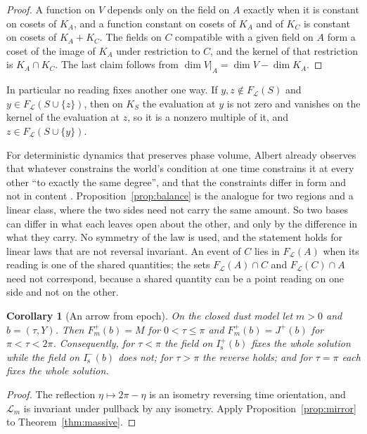 \documentclass[11pt]{article}
\newtheorem{corollary}[theorem]{Corollary}
\theoremstyle{definition}
\newcommand{\Jp}{J^{+}}
\newcommand{\Is}{I^-_{\mathrm s}}
\newcommand{\Isp}{I^+_{\mathrm s}}
\begin{document}
\begin{proof}
A function on $V$ depends only on the field on $A$ exactly when it is constant on cosets of $K_A$, and a function constant on cosets of $K_A$ and of $K_C$ is constant on cosets of $K_A+K_C$. The fields on $C$ compatible with a given field on $A$ form a coset of the image of $K_A$ under restriction to $C$, and the kernel of that restriction is $K_A\cap K_C$. The last claim follows from $\dim V|_A=\dim V-\dim K_A$.
\end{proof}

In particular no reading fixes another one way. If $y,z\notin F_{\mathcal L}(S)$ and $y\in F_{\mathcal L}(S\cup\{z\})$, then on $K_S$ the evaluation at $y$ is not zero and vanishes on the kernel of the evaluation at $z$, so it is a nonzero multiple of it, and $z\in F_{\mathcal L}(S\cup\{y\})$.

For deterministic dynamics that preserves phase volume, Albert already observes that whatever constrains the world's condition at one time constrains it at every other ``to exactly the same degree'', and that the constraints differ in form and not in content \citep[pp.~121--122, n.~11]{Albert2000}. Proposition~\ref{prop:balance} is the analogue for two regions and a linear class, where the two sides need not carry the same amount. So two bases can differ in what each leaves open about the other, and only by the difference in what they carry. No symmetry of the law is used, and the statement holds for linear laws that are not reversal invariant. An event of $C$ lies in $F_{\mathcal L}(A)$ when its reading is one of the shared quantities; the sets $F_{\mathcal L}(A)\cap C$ and $F_{\mathcal L}(C)\cap A$ need not correspond, because a shared quantity can be a point reading on one side and not on the other.

\begin{corollary}[An arrow from epoch]\label{cor:epoch}
On the closed dust model let $m>0$ and $b=(\tau,Y)$. Then $F^+_m(b)=M$ for $0<\tau\le\pi$ and $F^+_m(b)=\Jp(b)$ for $\pi<\tau<2\pi$. Consequently, for $\tau<\pi$ the field on $\Isp(b)$ fixes the whole solution while the field on $\Is(b)$ does not; for $\tau>\pi$ the reverse holds; and for $\tau=\pi$ each fixes the whole solution.
\end{corollary}

\begin{proof}
The reflection $\eta\mapsto2\pi-\eta$ is an isometry reversing time orientation, and $\mathcal L_m$ is invariant under pullback by any isometry. Apply Proposition~\ref{prop:mirror} to Theorem~\ref{thm:massive}.
\end{proof}
\end{document}
